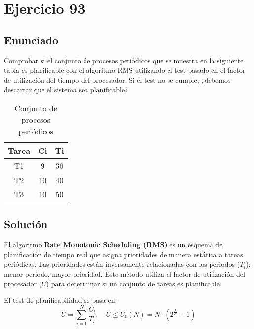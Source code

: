 \documentclass[a4paper,12pt]{article}
\begin{document}



\section{Ejercicio 93}
\subsection{Enunciado}
Comprobar si el conjunto de procesos periódicos que se muestra en la siguiente tabla es planificable con el algoritmo RMS utilizando el test basado en el factor de utilización del tiempo del procesador. Si el test no se cumple, ¿debemos descartar que el sistema sea planificable?

\begin{table}[H]
\centering
\begin{tabular}{|c|c|c|}
\hline
\textbf{Tarea} & \textbf{Ci} & \textbf{Ti} \\ \hline
T1 & 9 & 30 \\ \hline
T2 & 10 & 40 \\ \hline
T3 & 10 & 50 \\ \hline
\end{tabular}
\caption{Conjunto de procesos periódicos}
\end{table}

\subsection{Solución}
El algoritmo \textbf{Rate Monotonic Scheduling (RMS)} es un esquema de planificación de tiempo real que asigna prioridades de manera estática a tareas periódicas. Las prioridades están inversamente relacionadas con los periodos (\(T_i\)): menor periodo, mayor prioridad. Este método utiliza el factor de utilización del procesador (\(U\)) para determinar si un conjunto de tareas es planificable.

El test de planificabilidad se basa en:
\[
U = \sum_{i=1}^{N} \frac{C_i}{T_i}, \quad U \leq U_0(N) = N \cdot (2^{\frac{1}{N}} - 1)
\]
\end{document}
